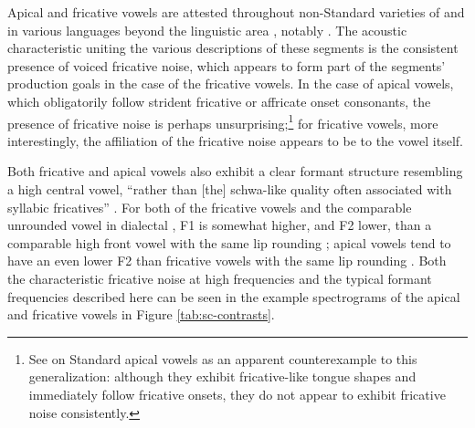 \documentclass[output=paper,hidelinks]{langscibook}
\begin{document}
Apical and fricative vowels are attested throughout non-Standard varieties of  \citep{zhu-high, zee-icphs} and in various languages beyond the  linguistic area \citep{bjorsten1999, connell, westerberg}, notably . The acoustic characteristic uniting the various descriptions of these segments is the consistent presence of voiced fricative noise, which appears to form part of the segments' production goals in the case of the fricative vowels. In the case of apical vowels, which obligatorily follow strident fricative or affricate onset consonants, the presence of fricative noise is perhaps unsurprising;\footnote{See \citet{leekim-s} on Standard  apical vowels as an apparent counterexample to this generalization: although they exhibit fricative-like tongue shapes and immediately follow fricative onsets, they do not appear to exhibit fricative noise consistently.} for fricative vowels, more interestingly, the affiliation of the fricative noise appears to be to the vowel itself.\largerpage[2]

Both fricative and apical vowels also exhibit a clear formant structure resembling a high central vowel, ``rather than [the] schwa-like quality often associated with syllabic fricatives'' \citep[15]{connell}. For both of the \SC{} fricative vowels and the comparable unrounded vowel in dialectal , F1 is somewhat higher, and F2 lower, than a comparable high front vowel with the same lip rounding \citep{bjorsten1999, ling-phd, schotz-i, westerberg}; apical vowels tend to have an even lower F2 than fricative vowels with the same lip rounding \citep[46--53]{ling-phd}. Both the characteristic fricative noise at high frequencies and the typical formant frequencies described here can be seen in the example spectrograms of the \SC{} apical and fricative vowels in Figure \ref{tab:sc-contrasts}.
\end{document}
